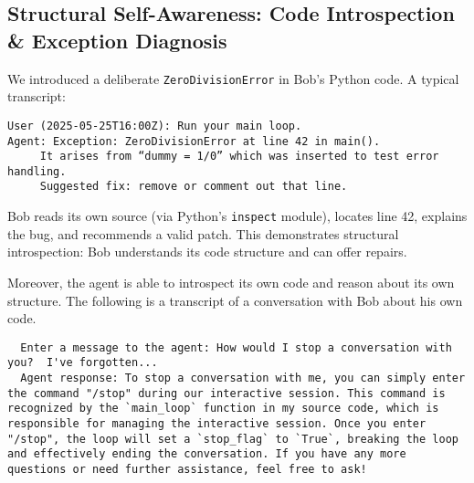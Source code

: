 \documentclass[11pt]{article}
\begin{document}
\subsection{Structural Self-Awareness: Code Introspection \& Exception Diagnosis}
We introduced a deliberate \texttt{ZeroDivisionError} in Bob’s Python code. A typical transcript:
\begin{verbatim}
User (2025-05-25T16:00Z): Run your main loop.
Agent: Exception: ZeroDivisionError at line 42 in main().
     It arises from “dummy = 1/0” which was inserted to test error handling.
     Suggested fix: remove or comment out that line.
\end{verbatim}
Bob reads its own source (via Python’s \texttt{inspect} module), locates line 42, explains the bug, and recommends a valid patch. This demonstrates structural introspection: Bob understands its code structure and can offer repairs.

Moreover, the agent is able to introspect its own code and reason about its own structure.  The following is a transcript of a conversation with Bob about his own code.

\begin{verbatim}
  Enter a message to the agent: How would I stop a conversation with you?  I've forgotten...
  Agent response: To stop a conversation with me, you can simply enter the command "/stop" during our interactive session. This command is recognized by the `main_loop` function in my source code, which is responsible for managing the interactive session. Once you enter "/stop", the loop will set a `stop_flag` to `True`, breaking the loop and effectively ending the conversation. If you have any more questions or need further assistance, feel free to ask!
  \end{verbatim}
\end{document}

